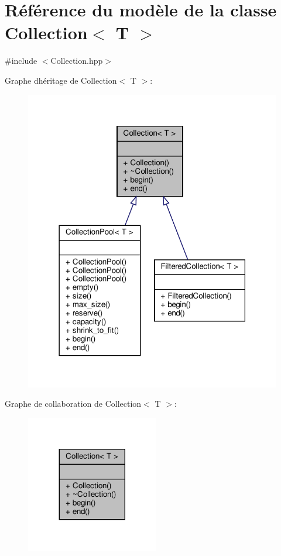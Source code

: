 \hypertarget{class_collection}{}\section{Référence du modèle de la classe Collection$<$ T $>$}
\label{class_collection}


{\ttfamily \#include $<$Collection.\+hpp$>$}



Graphe d\textquotesingle{}héritage de Collection$<$ T $>$\+:\nopagebreak
\begin{figure}[H]
\begin{center}
\leavevmode
\includegraphics[width=318pt]{class_collection__inherit__graph}
\end{center}
\end{figure}


Graphe de collaboration de Collection$<$ T $>$\+:\nopagebreak
\begin{figure}[H]
\begin{center}
\leavevmode
\includegraphics[width=164pt]{class_collection__coll__graph}
\end{center}
\end{figure}
